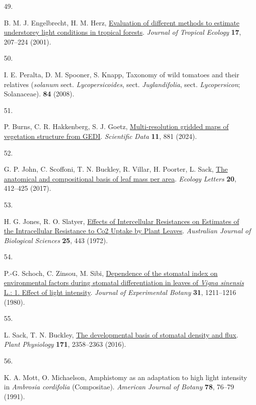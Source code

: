\documentclass[
  letterpaper,
  DIV=11,
  numbers=noendperiod]{scrartcl}
\newlength{\cslhangindent}
\newlength{\csllabelwidth}
\newenvironment{CSLReferences}[2] %
 {\begin{list}{}{%
  \setlength{\itemindent}{0pt}
  \setlength{\leftmargin}{0pt}
  \setlength{\parsep}{0pt}
  \ifodd #1
   \setlength{\leftmargin}{\cslhangindent}
   \setlength{\itemindent}{-1\cslhangindent}
  \fi
  \setlength{\itemsep}{#2\baselineskip}}}
 {\end{list}}
\newcommand{\CSLLeftMargin}[1]{\parbox[t]{\csllabelwidth}{\strut#1\strut}}
\newcommand{\CSLRightInline}[1]{\parbox[t]{\linewidth - \csllabelwidth}{\strut#1\strut}}
\begin{document}
\begin{CSLReferences}{0}{1}
\CSLLeftMargin{49. }%
\CSLRightInline{B. M. J. Engelbrecht, H. M. Herz,
\href{https://doi.org/10.1017/S0266467401001146}{Evaluation of different
methods to estimate understorey light conditions in tropical forests}.
\emph{Journal of Tropical Ecology} \textbf{17}, 207--224 (2001).}

\CSLLeftMargin{50. }%
\CSLRightInline{I. E. Peralta, D. M. Spooner, S. Knapp, Taxonomy of wild
tomatoes and their relatives (\emph{solanum} sect.
\emph{Lycopersicoides}, sect. \emph{Juglandifolia}, sect.
\emph{Lycopersicon}; {Solanaceae}). \textbf{84} (2008).}

\CSLLeftMargin{51. }%
\CSLRightInline{P. Burns, C. R. Hakkenberg, S. J. Goetz,
\href{https://doi.org/10.1038/s41597-024-03668-4}{Multi-resolution
gridded maps of vegetation structure from {GEDI}}. \emph{Scientific
Data} \textbf{11}, 881 (2024).}

\CSLLeftMargin{52. }%
\CSLRightInline{G. P. John, C. Scoffoni, T. N. Buckley, R. Villar, H.
Poorter, L. Sack, \href{https://doi.org/10.1111/ele.12739}{The
anatomical and compositional basis of leaf mass per area}. \emph{Ecology
Letters} \textbf{20}, 412--425 (2017).}

\CSLLeftMargin{53. }%
\CSLRightInline{H. G. Jones, R. O. Slatyer,
\href{https://doi.org/10.1071/BI9720443}{Effects of {Intercellular}
{Resistances} on {Estimates} of the {Intracellular} {Resistance} to
{Co2} {Uptake} by {Plant} {Leaves}}. \emph{Australian Journal of
Biological Sciences} \textbf{25}, 443 (1972).}

\CSLLeftMargin{54. }%
\CSLRightInline{P.-G. Schoch, C. Zinsou, M. Sibi,
\href{https://doi.org/10.1093/jxb/31.5.1211}{Dependence of the stomatal
index on environmental factors during stomatal differentiation in leaves
of \emph{{Vigna} sinensis} {L}.: 1. {Effect} of light intensity}.
\emph{Journal of Experimental Botany} \textbf{31}, 1211--1216 (1980).}

\CSLLeftMargin{55. }%
\CSLRightInline{L. Sack, T. N. Buckley,
\href{https://doi.org/10.1104/pp.16.00476}{The developmental basis of
stomatal density and flux}. \emph{Plant Physiology} \textbf{171},
2358--2363 (2016).}

\CSLLeftMargin{56. }%
\CSLRightInline{K. A. Mott, O. Michaelson, Amphistomy as an adaptation
to high light intensity in \emph{{Ambrosia} cordifolia} ({Compositae}).
\emph{American Journal of Botany} \textbf{78}, 76--79 (1991).}


\end{CSLReferences}
\end{document}
